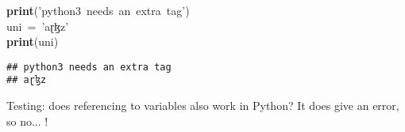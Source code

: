 \documentclass[output=inprep,
		biblatex
		]{LSP/langsci}\usepackage[]{graphicx}\usepackage[]{color}
\makeatletter
\newcommand{\hlstr}[1]{\textcolor[rgb]{0.192,0.494,0.8}{#1}}%
\newcommand{\hlopt}[1]{\textcolor[rgb]{0,0,0}{#1}}%
\newcommand{\hlstd}[1]{\textcolor[rgb]{0.345,0.345,0.345}{#1}}%
\newcommand{\hlkwa}[1]{\textcolor[rgb]{0.161,0.373,0.58}{\textbf{#1}}}%
\newenvironment{kframe}{%
 \def\at@end@of@kframe{}%
 \ifinner\ifhmode%
  \def\at@end@of@kframe{\end{minipage}}%
  \begin{minipage}{\columnwidth}%
 \fi\fi%
 \def\FrameCommand##1{\hskip\@totalleftmargin \hskip-\fboxsep
 \colorbox{shadecolor}{##1}\hskip-\fboxsep
     \hskip-\linewidth \hskip-\@totalleftmargin \hskip\columnwidth}%
 \MakeFramed {\advance\hsize-\width
   \@totalleftmargin\z@ \linewidth\hsize
   \@setminipage}}%
 {\par\unskip\endMakeFramed%
 \at@end@of@kframe}
\newenvironment{knitrout}{}{} %
\makeatother
\begin{document}
\begin{knitrout}\footnotesize
{}\color{fgcolor}\begin{kframe}
\noindent
\ttfamily
\hlstd{}\hlkwa{print}\hlstd{}\hlopt{(}\hlstd{}\hlstr{'python3\ needs\ an\ extra\ tag'}\hlstd{}\hlopt{)}\hspace*{\fill}\\
\hlstd{uni\ }\hlopt{=\ }\hlstd{}\hlstr{'aɽɮz'}\hlstd{}\hspace*{\fill}\\
\hlkwa{print}\hlstd{}\hlopt{(}\hlstd{uni}\hlopt{)}\hlstd{}\hspace*{\fill}
\mbox{}
\normalfont

\begin{verbatim}
## python3 needs an extra tag
## aɽɮz
\end{verbatim}
\end{kframe}
\end{knitrout}

Testing: does referencing to variables also work in Python? It does give an error, so no... !






\begin{comment}
===
Double quotation marks are generally used for distancing, in particular in the following situations:

1. when a passage from another work is cited in the text (e.g. According to Takahashi (2009: 33), “quotatives were never used in subordinate clauses in Old Japanese”); but block quotations do not have quotation marks;
2. when a technical term is mentioned that the author does not want to adopt, but wants to mention, e.g. This is sometimes called “pseudo-conservatism”, but I will not use this term here, as it could lead to confusion.

Single quotation marks are used exclusively for linguistic meanings, as in the following: Latin habere ‘have’ is not cognate with Old English hafian ‘have’.

===
so, we should normally use double quotation in most of our cases :-). In general though, I would like us to try and remove double quotations as much as possible. Mostly is thus signals uncertainty on our part :-).

\end{comment}
\end{document}
